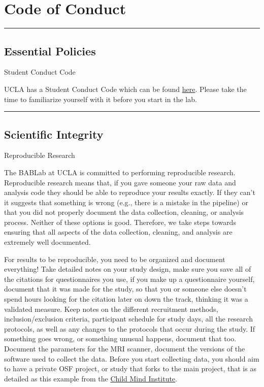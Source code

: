 \documentclass[
]{book}
\begin{document}
\hypertarget{code-of-conduct}{%
\chapter{Code of Conduct}\label{code-of-conduct}}

\begin{center}\rule{0.5\linewidth}{0.5pt}\end{center}

\hypertarget{essential-policies}{%
\section{Essential Policies}\label{essential-policies}}

Student Conduct Code

UCLA has a Student Conduct Code which can be found \href{https://www.deanofstudents.ucla.edu/Individual-Student-Code}{here}. Please take the time to familiarize yourself with it before you start in the lab.

\begin{center}\rule{0.5\linewidth}{0.5pt}\end{center}

\hypertarget{scientific-integrity}{%
\section{Scientific Integrity}\label{scientific-integrity}}

Reproducible Research

The BABLab at UCLA is committed to performing reproducible research. Reproducible research means that, if you gave someone your raw data and analysis code they should be able to reproduce your results exactly. If they can't it suggests that something is wrong (e.g., there is a mistake in the pipeline) or that you did not properly document the data collection, cleaning, or analysis process. Neither of these options is good. Therefore, we take steps towards ensuring that all aspects of the data collection, cleaning, and analysis are extremely well documented.

For results to be reproducible, you need to be organized and document everything! Take detailed notes on your study design, make sure you save all of the citations for questionnaires you use, if you make up a questionnaire yourself, document that it was made for the study, so that you or someone else doesn't spend hours looking for the citation later on down the track, thinking it was a validated measure. Keep notes on the different recruitment methods, inclusion/exclusion criteria, participant schedule for study days, all the research protocols, as well as any changes to the protocols that occur during the study. If something goes wrong, or something unusual happens, document that too. Document the parameters for the MRI scanner, document the versions of the software used to collect the data. Before you start collecting data, you should aim to have a private OSF project, or study that forks to the main project, that is as detailed as this example from the \href{https://childmind.org}{Child Mind Institute}.
\end{document}
